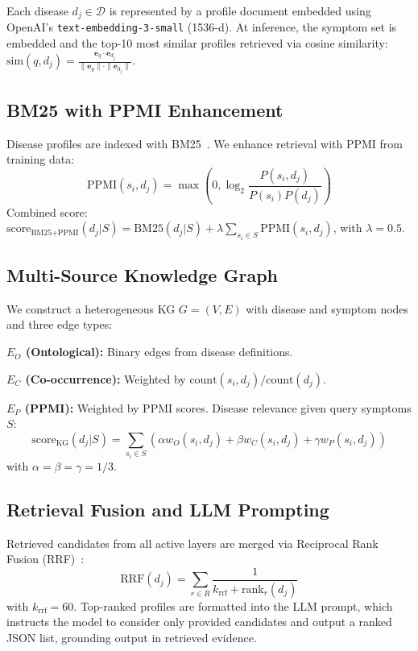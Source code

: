 \documentclass[runningheads]{llncs}
\begin{document}
Each disease $d_j \in \mathcal{D}$ is represented by a profile document embedded using OpenAI's \texttt{text-embedding-3-small} (1536-d). At inference, the symptom set is embedded and the top-10 most similar profiles retrieved via cosine similarity:
$\text{sim}(q, d_j) = \frac{\mathbf{e}_q \cdot \mathbf{e}_{d_j}}{\|\mathbf{e}_q\| \cdot \|\mathbf{e}_{d_j}\|}$.

\subsection{BM25 with PPMI Enhancement}
\label{sec:bm25}

Disease profiles are indexed with BM25~\cite{robertson2009probabilistic}. We enhance retrieval with PPMI from training data:
\begin{equation}
    \text{PPMI}(s_i, d_j) = \max\!\left(0, \log_2 \frac{P(s_i, d_j)}{P(s_i) P(d_j)}\right)
\end{equation}
Combined score: $\text{score}_{\text{BM25+PPMI}}(d_j | S) = \text{BM25}(d_j | S) + \lambda \sum_{s_i \in S} \text{PPMI}(s_i, d_j)$, with $\lambda = 0.5$.

\subsection{Multi-Source Knowledge Graph}
\label{sec:kg}

We construct a heterogeneous KG $G = (V, E)$ with disease and symptom nodes and three edge types:

\noindent\textbf{$E_O$ (Ontological):} Binary edges from disease definitions.

\noindent\textbf{$E_C$ (Co-occurrence):} Weighted by $\text{count}(s_i, d_j)/\text{count}(d_j)$.

\noindent\textbf{$E_P$ (PPMI):} Weighted by PPMI scores.
Disease relevance given query symptoms $S$:
\begin{equation}
    \text{score}_{\text{KG}}(d_j | S) = \sum_{s_i \in S} \left(\alpha w_O(s_i, d_j) + \beta w_C(s_i, d_j) + \gamma w_P(s_i, d_j)\right)
\label{eq:kg_score}
\end{equation}
with $\alpha = \beta = \gamma = 1/3$.

\subsection{Retrieval Fusion and LLM Prompting}
\label{sec:fusion}

Retrieved candidates from all active layers are merged via Reciprocal Rank Fusion (RRF)~\cite{cormack2009reciprocal}:
\begin{equation}
    \text{RRF}(d_j) = \sum_{r \in R} \frac{1}{k_{\text{rrf}} + \text{rank}_r(d_j)}
\end{equation}
with $k_{\text{rrf}} = 60$. Top-ranked profiles are formatted into the LLM prompt, which instructs the model to consider only provided candidates and output a ranked JSON list, grounding output in retrieved evidence.
\end{document}
